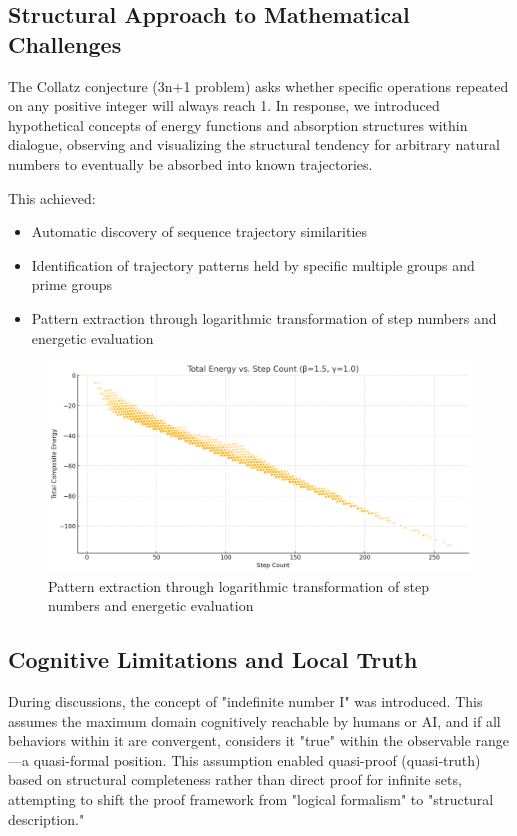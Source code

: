 \documentclass[11pt]{article}
\begin{document}
\subsection{Structural Approach to Mathematical Challenges}
The Collatz conjecture (3n+1 problem) asks whether specific operations repeated on any positive integer will always reach 1. In response, we introduced hypothetical concepts of energy functions and absorption structures within dialogue, observing and visualizing the structural tendency for arbitrary natural numbers to eventually be absorbed into known trajectories.

This achieved:
\begin{itemize}
\item Automatic discovery of sequence trajectory similarities
\item Identification of trajectory patterns held by specific multiple groups and prime groups  
\item Pattern extraction through logarithmic transformation of step numbers and energetic evaluation
\end{itemize}
\begin{figure}[!htbp]
    \centering
    \includegraphics[width=0.8\linewidth]{collatz.png}
    \caption{Pattern extraction through logarithmic transformation of step numbers and energetic evaluation}
    \label{collatz}
\end{figure}
\subsection{Cognitive Limitations and Local Truth}
During discussions, the concept of "indefinite number I" was introduced. This assumes the maximum domain cognitively reachable by humans or AI, and if all behaviors within it are convergent, considers it "true" within the observable range—a quasi-formal position.
This assumption enabled quasi-proof (quasi-truth) based on structural completeness rather than direct proof for infinite sets, attempting to shift the proof framework from "logical formalism" to "structural description."
\end{document}

